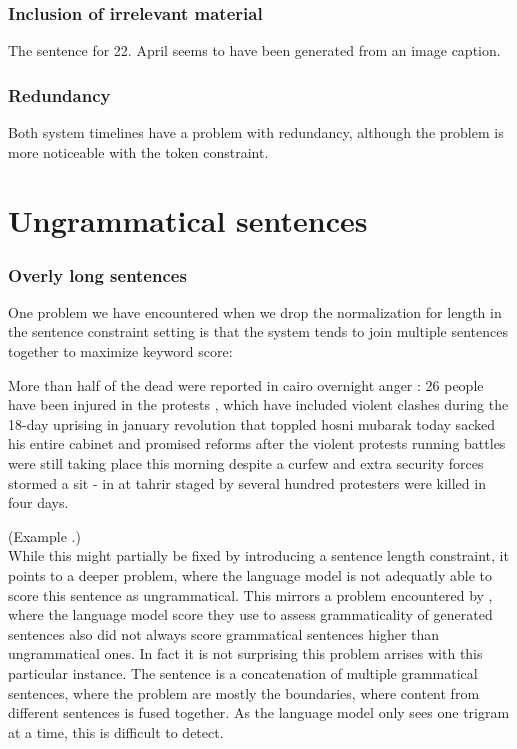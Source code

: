 \documentclass[a4paper,BCOR=10mm]{report}
\newcounter{quotecount}[chapter]
\newcommand{\countquote}[1]{\vspace{1cm}\refstepcounter{quotecount}%
     \parbox{9cm}{#1}\hspace*{1cm}(Example \thechapter.\arabic{quotecount})\\[1cm]}
\numberwithin{lemma}{chapter}
\numberwithin{definition}{chapter}
\begin{document}
\subsubsection{Inclusion of irrelevant material}

The sentence for 22. April seems to have been generated from an image caption.

\subsubsection{Redundancy}

Both system timelines have a problem with redundancy, although the problem is more noticeable with the token constraint.


\section{Ungrammatical sentences}

\subsubsection{Overly long sentences}

One problem we have encountered when we drop the normalization for length in the sentence constraint setting is that the system tends to join multiple sentences together to maximize keyword score:

\countquote{
More than half of the dead were reported in cairo overnight anger : 26 people have been injured in the protests , which have included violent clashes during the 18-day uprising in january revolution that toppled hosni mubarak today sacked his entire cabinet and promised reforms after the violent protests running battles were still taking place this morning despite a curfew and extra security forces stormed a sit - in at tahrir staged by several hundred protesters were killed in four days.
}

While this might partially be fixed by introducing a sentence length constraint, it points to a deeper problem, where the language model is not adequatly able to score this sentence as ungrammatical.
This mirrors a problem encountered by \citet{mckeown}, where the language model score they use to assess grammaticality of generated sentences also did not always score grammatical sentences higher than ungrammatical ones. In fact it is not surprising this problem arrises with this particular instance. The sentence is a concatenation of multiple grammatical sentences, where the problem are mostly the boundaries, where content from different sentences is fused together. As the language model only sees one trigram at a time, this is difficult to detect.
\end{document}
